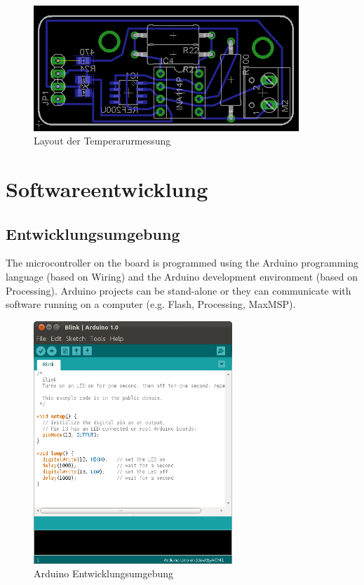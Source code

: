 \documentclass[a4paper,bibtotoc,oneside]{scrbook}
\begin{document}
\begin{figure}[htbp]
\centering
\includegraphics[width=100mm]{img/tmess2.png}
\caption[Arduino Mega 2560]{Layout der Temperarurmessung}\label{tmess2}
\end{figure}


\section{Softwareentwicklung}\thispagestyle{empty}
\subsection{Entwicklungsumgebung}\thispagestyle{empty}
The microcontroller on the board is programmed using the Arduino programming language (based on Wiring) and the Arduino development environment (based on Processing). Arduino projects can be stand-alone or they can communicate with software running on a computer (e.g. Flash, Processing, MaxMSP). 
\begin{figure}[htbp]
\centering
\includegraphics[width=75mm]{img/Arduino.png}
\caption[Arduino Entwicklungsumgebung]{Arduino Entwicklungsumgebung}\label{ardu2}
\end{figure}
\end{document}
